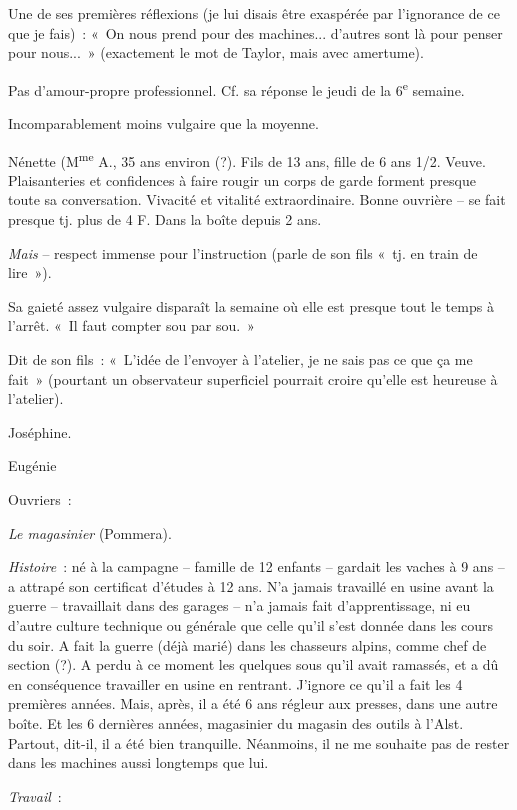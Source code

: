 \documentclass[french,twoside]{book} %
\begin{document}
Une de ses premières réflexions (je lui disais être exaspérée par l'ignorance de ce que je fais) : « On nous prend pour des machines... d'autres sont là pour penser pour nous... » (exactement le mot de Taylor, mais avec amertume).\par
Pas d'amour-propre professionnel. Cf. sa réponse le jeudi de la 6\textsuperscript{e} semaine.\par
Incomparablement moins vulgaire que la moyenne.\par
Nénette (M\textsuperscript{me} A., 35 ans environ (?). Fils de 13 ans, fille de 6 ans 1/2. Veuve. Plaisanteries et confidences à faire rougir un corps de garde forment presque toute sa conversation. Vivacité et vitalité extraordinaire. Bonne ouvrière – se fait presque tj. plus de 4 F. Dans la boîte depuis 2 ans.\par
{\itshape Mais} – respect immense pour l'instruction (parle de son fils « tj. en train de lire »).\par
Sa gaieté assez vulgaire disparaît la semaine où elle est presque tout le temps à l'arrêt. « Il faut compter sou par sou. »\par
\par
Dit de son fils : « L'idée de l'envoyer à l'atelier, je ne sais pas ce que ça me fait » (pourtant un observateur superficiel pourrait croire qu'elle est heureuse à l'atelier).\par
Joséphine.\par
Eugénie\par
Ouvriers :\par
{\itshape Le magasinier} (Pommera).\par
{\itshape Histoire} : né à la campagne – famille de 12 enfants – gardait les vaches à 9 ans – a attrapé son certificat d'études à 12 ans. N'a jamais travaillé en usine avant la guerre – travaillait dans des garages – n'a jamais fait d'apprentissage, ni eu d'autre culture technique ou générale que celle qu'il s'est donnée dans les cours du soir. A fait la guerre (déjà marié) dans les chasseurs alpins, comme chef de section (?). A perdu à ce moment les quelques sous qu'il avait ramassés, et a dû en conséquence travailler en usine en rentrant. J'ignore ce qu'il a fait les 4 premières années. Mais, après, il a été 6 ans régleur aux presses, dans une autre boîte. Et les 6 dernières années, magasinier du magasin des outils à l’Alst. Partout, dit-il, il a été bien tranquille. Néanmoins, il ne me souhaite pas de rester dans les machines aussi longtemps que lui.\par
{\itshape Travail} :\par
\end{document}
